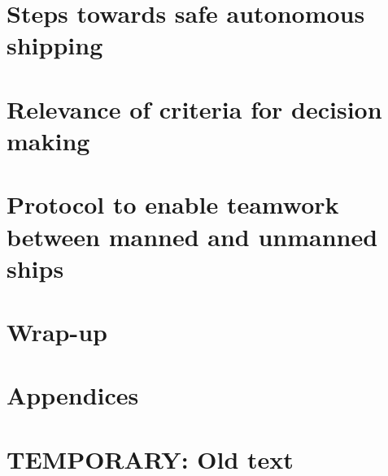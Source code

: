 \documentclass[a4paper,11pt,oneside]{book}
\begin{document}
\frontmatter


\makeCover %

\listoftodos[Notes]
\clearpage





\clearpage
\setcounter{tocdepth}{1}
\tableofcontents
\clearpage

\mainmatter



\part{Steps towards safe autonomous shipping}




\part{Relevance of criteria for decision making}
\label{part:MT}








\part{Protocol to enable teamwork between manned and unmanned ships}
\label{part:CS}





\part{Wrap-up}



\part{Appendices}
\begin{appendices}
	\appendix

	
	
	
	
	
\end{appendices}


\backmatter

\part{TEMPORARY: Old text}





\end{document}
